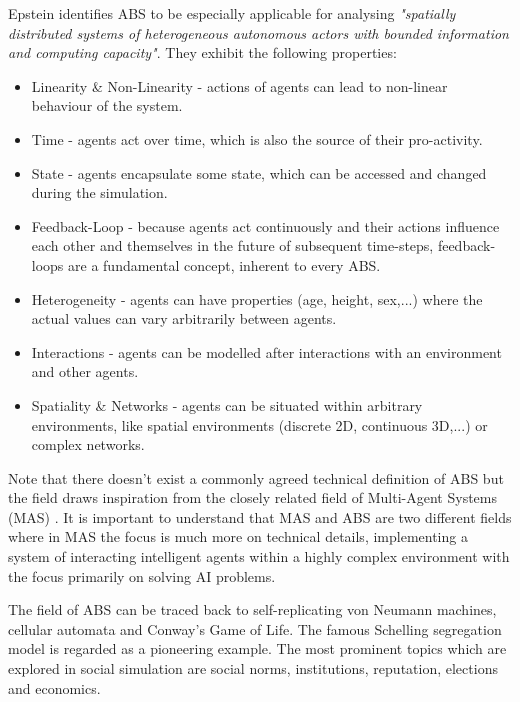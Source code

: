 Epstein \cite{epstein_generative_2012} identifies ABS to be especially applicable for analysing \textit{"spatially distributed systems of heterogeneous autonomous actors with bounded information and computing capacity"}. They exhibit the following properties:

\begin{itemize}
	\item Linearity \& Non-Linearity - actions of agents can lead to non-linear behaviour of the system.
	\item Time - agents act over time, which is also the source of their pro-activity.
	\item State - agents encapsulate some state, which can be accessed and changed during the simulation.
	\item Feedback-Loop - because agents act continuously and their actions influence each other and themselves in the future of subsequent time-steps, feedback-loops are a fundamental concept, inherent to every ABS. 
	\item Heterogeneity - agents can have properties (age, height, sex,...) where the actual values can vary arbitrarily between agents.
	\item Interactions - agents can be modelled after interactions with an environment and other agents.
	\item Spatiality \& Networks - agents can be situated within arbitrary environments, like spatial environments (discrete 2D, continuous 3D,...) or complex networks.
\end{itemize}

Note that there doesn't exist a commonly agreed technical definition of ABS but the field draws inspiration from the closely related field of Multi-Agent Systems (MAS) \cite{weiss_multiagent_2013,wooldridge_introduction_2009}. It is important to understand that MAS and ABS are two different fields where in MAS the focus is much more on technical details, implementing a system of interacting intelligent agents within a highly complex environment with the focus primarily on solving AI problems.

\medskip

The field of ABS can be traced back to self-replicating von Neumann machines, cellular automata and Conway's Game of Life. The famous Schelling segregation model \cite{schelling_dynamic_1971} is regarded as a pioneering example. The most prominent topics which are explored in social simulation are social norms, institutions, reputation, elections and economics.

